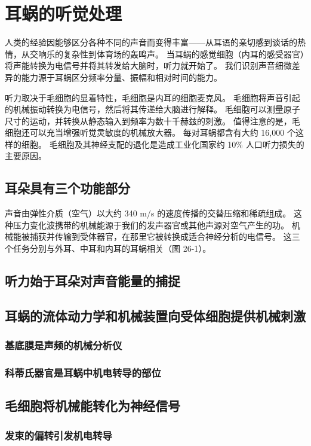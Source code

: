 \chapter{耳蜗的听觉处理}
人类的经验因能够区分各种不同的声音而变得丰富——从耳语的亲切感到谈话的热情，从交响乐的复杂性到体育场的轰鸣声。 当耳蜗的感觉细胞（内耳的感受器官）将声能转换为电信号并将其转发给大脑时，听力就开始了。 我们识别声音细微差异的能力源于耳蜗区分频率分量、振幅和相对时间的能力。

听力取决于毛细胞的显着特性，毛细胞是内耳的细胞麦克风。 毛细胞将声音引起的机械振动转换为电信号，然后将其传递给大脑进行解释。 毛细胞可以测量原子尺寸的运动，并转换从静态输入到频率为数十千赫兹的刺激。 值得注意的是，毛细胞还可以充当增强听觉灵敏度的机械放大器。 每对耳蜗都含有大约 16,000 个这样的细胞。 毛细胞及其神经支配的退化是造成工业化国家约 10\% 人口听力损失的主要原因。



\section{耳朵具有三个功能部分}
声音由弹性介质（空气）以大约 340 m/s 的速度传播的交替压缩和稀疏组成。 这种压力变化波携带的机械能源于我们的发声器官或其他声源对空气产生的功。 机械能被捕获并传输到受体器官，在那里它被转换成适合神经分析的电信号。 这三个任务分别与外耳、中耳和内耳的耳蜗相关（图 26-1）。


\section{听力始于耳朵对声音能量的捕捉}

\section{耳蜗的流体动力学和机械装置向受体细胞提供机械刺激}
\subsection{基底膜是声频的机械分析仪}
\subsection{科蒂氏器官是耳蜗中机电转导的部位}

\section{毛细胞将机械能转化为神经信号}
\subsection{发束的偏转引发机电转导}
